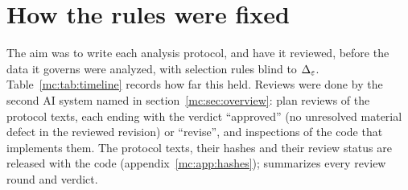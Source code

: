 \section{How the rules were fixed}\label{mc:sec:rules}
The aim was to write each analysis protocol, and have it reviewed, before the data it governs were analyzed, with selection rules blind to
$\Delta_\varepsilon$. Table~\ref{mc:tab:timeline} records how far this held. Reviews were done by the second AI system named in section~\ref{mc:sec:overview}:
plan reviews of the protocol texts, each ending with the verdict ``approved'' (no unresolved material defect in the reviewed revision) or
``revise'', and inspections of the code that implements them. The protocol texts, their hashes and their review status
are released with the code (appendix~\ref{mc:app:hashes});  summarizes every review round and verdict.
